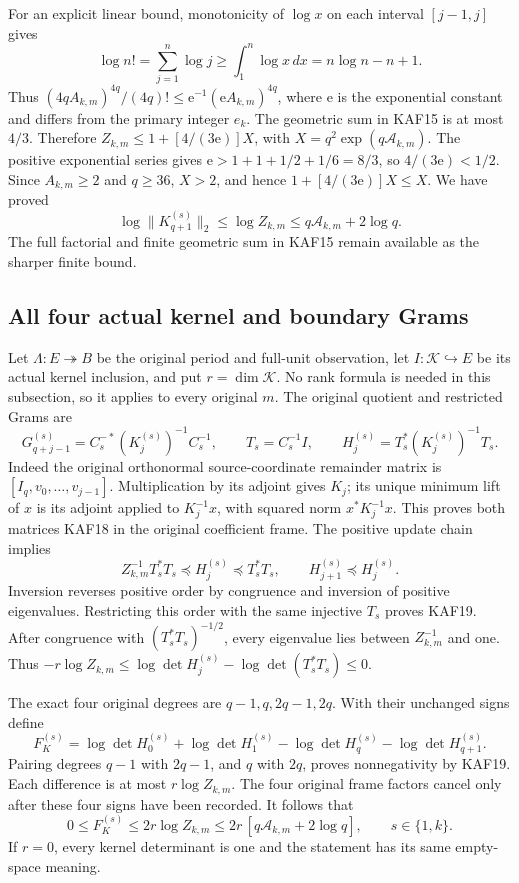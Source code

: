 \documentclass[11pt,a4paper]{article}
\begin{document}
For an explicit linear bound, monotonicity of $\log x$ on each
interval $[j-1,j]$ gives
\[
 \log n!=\sum_{j=1}^n\log j
       \ge\int_1^n\log x\,dx=n\log n-n+1.
\]
Thus $(4qA_{k,m})^{4q}/(4q)!\le
\mathrm e^{-1}(\mathrm e A_{k,m})^{4q}$, where $\mathrm e$ is
the exponential constant and differs from the primary integer $e_k$.
The geometric sum in KAF15 is at most $4/3$. Therefore
$Z_{k,m}\le1+[4/(3\mathrm e)]X$, with
$X=q^2\exp(q\mathcal A_{k,m})$. The positive exponential series
gives $\mathrm e>1+1+1/2+1/6=8/3$, so $4/(3\mathrm e)<1/2$.
Since $A_{k,m}\ge2$ and $q\ge36$, $X>2$, and hence
$1+[4/(3\mathrm e)]X\le X$. We have proved
\[
 \boxed{\log\|K_{q+1}^{(s)}\|_2\le\log Z_{k,m}
       \le q\mathcal A_{k,m}+2\log q.}
 \tag{KAF17}
\]
The full factorial and finite geometric sum in KAF15 remain available
as the sharper finite bound.

\subsection{All four actual kernel and boundary Grams}
Let $\Lambda:E\twoheadrightarrow B$ be the original period and full-unit
observation, let $I:\mathcal K\hookrightarrow E$ be its actual kernel
inclusion, and put $r=\dim\mathcal K$. No rank formula is needed in
this subsection, so it applies to every original $m$. The original
quotient and restricted Grams are
\[
 G_{q+j-1}^{(s)}=C_s^{-*}(K_j^{(s)})^{-1}C_s^{-1},\qquad
 T_s=C_s^{-1}I,\qquad H_j^{(s)}=T_s^*(K_j^{(s)})^{-1}T_s.
 \tag{KAF18}
\]
Indeed the original orthonormal source-coordinate remainder matrix is
$[I_q,v_0,\ldots,v_{j-1}]$. Multiplication by its adjoint gives $K_j$;
its unique minimum lift of $x$ is its adjoint applied to $K_j^{-1}x$,
with squared norm $x^*K_j^{-1}x$. This proves both matrices KAF18
in the original coefficient frame. The positive update chain implies
\[
 Z_{k,m}^{-1}T_s^*T_s\preceq H_j^{(s)}\preceq T_s^*T_s,
 \qquad H_{j+1}^{(s)}\preceq H_j^{(s)}.\tag{KAF19}
\]
Inversion reverses positive order by congruence and inversion of
positive eigenvalues. Restricting this order with the same injective
$T_s$ proves KAF19. After congruence with $(T_s^*T_s)^{-1/2}$,
every eigenvalue lies between $Z_{k,m}^{-1}$ and one. Thus
$-r\log Z_{k,m}\le\log\det H_j^{(s)}-
\log\det(T_s^*T_s)\le0$.

The exact four original degrees are $q-1,q,2q-1,2q$. With their
unchanged signs define
\[
 F_K^{(s)}=\log\det H_0^{(s)}+\log\det H_1^{(s)}
              -\log\det H_q^{(s)}-\log\det H_{q+1}^{(s)}.
\]
Pairing degrees $q-1$ with $2q-1$, and $q$ with $2q$, proves
nonnegativity by KAF19. Each difference is at most $r\log Z_{k,m}$.
The four original frame factors cancel only after these four signs
have been recorded. It follows that
\[
 \boxed{0\le F_K^{(s)}\le2r\log Z_{k,m}
       \le2r\,[q\mathcal A_{k,m}+2\log q],\qquad s\in\{1,k\}.}
 \tag{KAF20}
\]
If $r=0$, every kernel determinant is one and the statement has its
same empty-space meaning.
\end{document}
